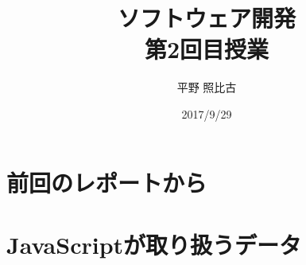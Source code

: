 
\newcommand{\ElmJ}{\texttt}
\title{ソフトウェア開発\\第2回目授業}
\author{平野 照比古}
\institute{}
\date{2017/9/29}

\frame{\maketitle}
\section{前回のレポートから}
\begin{frame}
\frametitle{}
\end{frame}
\section{JavaScriptが取り扱うデータ}
